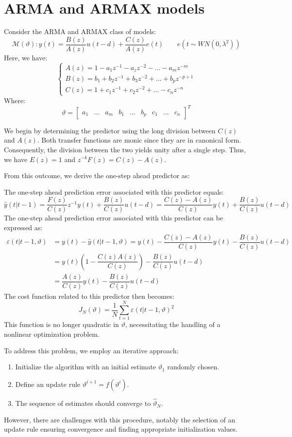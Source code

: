 \section{ARMA and ARMAX models}

Consider the ARMA and ARMAX class of models:
\[\mathcal{M}(\vartheta): y(t)=\dfrac{B(z)}{A(z)}u(t-d)+\dfrac{C(z)}{A(z)}e(t)\qquad e(t \sim WN(0,\lambda^2))\]
Here, we have:
\[\begin{cases}
    A(z)=1-a_1z^{-1}-a_zz^{-2}-\dots-a_mz^{-m} \\
    B(z)=b_1+b_2z^{-1}+b_3z^{-2}+\dots+b_pz^{-p+1} \\
    C(z)=1+c_1z^{-1}+c_2z^{-2}+\dots-c_nz^{-n}
\end{cases}\]
Where: 
\[\vartheta=\begin{bmatrix}
    a_1 & \dots & a_m & b_1 & \dots & b_p & c_1 & \dots & c_n
\end{bmatrix}^T\]

We begin by determining the predictor using the long division between $C(z)$ and $A(z)$. 
Both transfer functions are monic since they are in canonical form. 
Consequently, the division between the two yields unity after a single step. 
Thus, we have $E(z)=1$ and $z^{-k}F(z)=C(z)-A(z)$.

From this outcome, we derive the one-step ahead predictor as:

The one-step ahead prediction error associated with this predictor equals:
\[\hat{y}(t|t-1)=\dfrac{F(z)}{C(z)}z^{-1}y(t)+\dfrac{B(z)}{C(z)}u(t-d)=\dfrac{C(z)-A(z)}{C(z)}y(t)+\dfrac{B(z)}{C(z)}u(t-d)\]
The one-step ahead prediction error associated with this predictor can be expressed as:
\begin{align*}
    \varepsilon(t|t-1,\vartheta)&=y(t)-\hat{y}(t|t-1,\vartheta)=y(t)-\dfrac{C(z)-A(z)}{C(z)}y(t)-\dfrac{B(z)}{C(z)}u(t-d)\\
                                &=y(t)\left(1-\dfrac{C(z)A(z)}{C(z)}\right) - \dfrac{B(z)}{C(z)}u(t-d) \\
                                &=\dfrac{A(z)}{C(z)}y(t)-\dfrac{B(z)}{C(z)}u(t-d)
\end{align*}
The cost function related to this predictor then becomes:
\[J_N(\vartheta)=\dfrac{1}{N}\sum_{t=1}^N \varepsilon(t|t-1,\vartheta)^2\]
This function is no longer quadratic in $\vartheta$, necessitating the handling of a nonlinear optimization problem.

To address this problem, we employ an iterative approach:
\begin{enumerate}
    \item Initialize the algorithm with an initial estimate $\vartheta_1$ randomly chosen.
    \item Define an update rule $\vartheta^{i+1}=f\left(\vartheta^{i}\right)$.
    \item The sequence of estimates should converge to $\hat{\vartheta}_N$.
\end{enumerate}
However, there are challenges with this procedure, notably the selection of an update rule ensuring convergence and finding appropriate initialization values.

